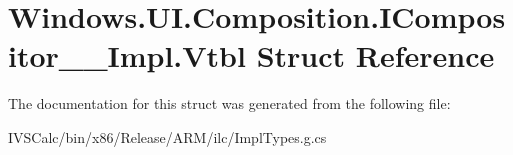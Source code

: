 \hypertarget{struct_windows_1_1_u_i_1_1_composition_1_1_i_compositor_____impl_1_1_vtbl}{}\section{Windows.\+U\+I.\+Composition.\+I\+Compositor\+\_\+\+\_\+\+Impl.\+Vtbl Struct Reference}
\label{struct_windows_1_1_u_i_1_1_composition_1_1_i_compositor_____impl_1_1_vtbl}


The documentation for this struct was generated from the following file\+:\begin{DoxyCompactItemize}
\item 
I\+V\+S\+Calc/bin/x86/\+Release/\+A\+R\+M/ilc/Impl\+Types.\+g.\+cs\end{DoxyCompactItemize}
